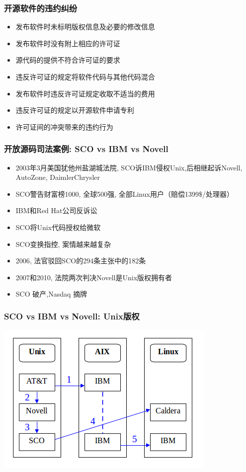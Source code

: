 \documentclass[compress]{beamer}
\begin{document}
\begin{frame}
\frametitle{开源软件的违约纠纷}

\begin{itemize}
\item 发布软件时未标明版权信息及必要的修改信息
\item 发布软件时没有附上相应的许可证
\item 源代码的提供不符合许可证的要求
\item 违反许可证的规定将软件代码与其他代码混合
\item 发布软件时违反许可证规定收取不适当的费用
\item 违反许可证的规定以开源软件申请专利
\item 许可证间的冲突带来的违约行为
\end{itemize}

\end{frame}

\begin{frame}
\frametitle{开放源码司法案例: SCO vs IBM vs Novell}
\begin{itemize}
\item 2003年3月美国犹他州盐湖城法院, SCO诉IBM侵权Unix,后相继起诉Novell, AutoZone, DaimlerChrysler
\item SCO警告财富榜1000, 全球500强, 全部Linux用户（赔偿1399\$/处理器）
\item IBM和Red Hat公司反诉讼
\item SCO将Unix代码授权给微软
\item SCO变换指控, 案情越来越复杂
\item 2006, 法官驳回SCO的294条主张中的182条
\item 2007和2010, 法院两次判决Novell是Unix版权拥有者
\item SCO 破产,Nasdaq 摘牌
\end{itemize}
\end{frame}

\begin{frame}
\frametitle{SCO vs IBM vs Novell: Unix版权}
\includegraphics[scale=0.5]{unix_right.png}
\end{frame}
\end{document}
